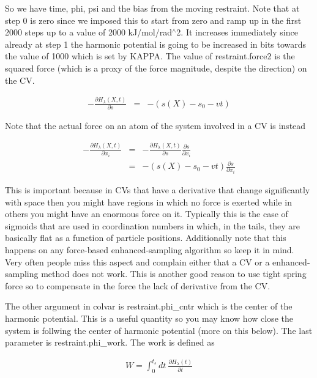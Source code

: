 So we have time, phi, psi and the bias from the moving restraint. Note that at step 0 is zero since we imposed this to start from zero and ramp up in the first 2000 steps up to a value of 2000 k\+J/mol/rad$^\wedge$2. It increases immediately since already at step 1 the harmonic potential is going to be increased in bits towards the value of 1000 which is set by K\+A\+P\+P\+A. The value of restraint.\+force2 is the squared force (which is a proxy of the force magnitude, despite the direction) on the C\+V.

\begin{eqnarray*} -\frac{\partial H_\lambda(X,t)}{\partial s}&=&-(s(X)-s_0-vt) \end{eqnarray*}

Note that the actual force on an atom of the system involved in a C\+V is instead

\begin{eqnarray*} -\frac{\partial H_\lambda(X,t)}{\partial x_i}&=& -\frac{\partial H_\lambda(X,t)}{\partial s} \frac{\partial s}{\partial x_i} \\ &=& -(s(X)-s_0-vt) \frac{\partial s}{\partial x_i} \end{eqnarray*}

This is important because in C\+Vs that have a derivative that change significantly with space then you might have regions in which no force is exerted while in others you might have an enormous force on it. Typically this is the case of sigmoids that are used in coordination numbers in which, in the tails, they are basically flat as a function of particle positions. Additionally note that this happens on any force-\/based enhanced-\/sampling algorithm so keep it in mind. Very often people miss this aspect and complain either that a C\+V or a enhanced-\/sampling method does not work. This is another good reason to use tight spring force so to compensate in the force the lack of derivative from the C\+V.

The other argument in colvar is restraint.\+phi\+\_\+cntr which is the center of the harmonic potential. This is a useful quantity so you may know how close the system is follwing the center of harmonic potential (more on this below). The last parameter is restraint.\+phi\+\_\+work. The work is defined as

\begin{eqnarray*} W=\int_0^{t_s}dt\ \frac{\partial H_\lambda(t)}{\partial t} \end{eqnarray*}

